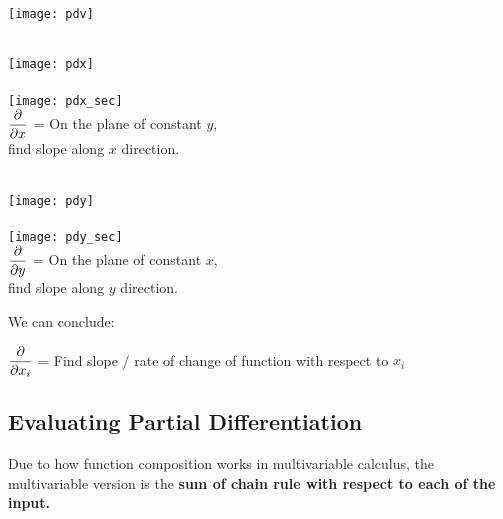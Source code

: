 \documentclass[class=article, crop=false, 12pt]{standalone}
\begin{document}
\begin{center}
    \texttt{[image: pdv]}
    \\[1em]
    \begin{minipage}{0.48\textwidth}
        \centering
        \\
        \texttt{[image: pdx]}
        \\
        \yellow{\Large $\Downarrow$}
        \\
        \texttt{[image: pdx\_sec]}
        \\
        $\pdvv{x}$ = On the plane of constant $y$, \\
        \hspace{6ex} find slope along $x$ direction.
    \end{minipage}
    \hfill\vline\hfill
    \begin{minipage}{0.48\textwidth}
        \centering
        \\
        \texttt{[image: pdy]}
        \\
        \blue{\Large $\Downarrow$}
        \\
        \texttt{[image: pdy\_sec]}
        \\
        $\pdvv{y}$ = On the plane of constant $x$, \\
        \hspace{6ex} find slope along $y$ direction.
    \end{minipage}
\end{center}


\newpage
We can conclude:
\begin{center}
    \begin{minipage}{0.75\textwidth}
        \begin{framed}
            \centering
            $\pdvv{x_i}$ = Find slope / rate of change of function with respect to $x_i$
        \end{framed}
    \end{minipage}
\end{center}

    


\subsection{Evaluating Partial Differentiation}

Due to how function composition works in multivariable calculus, 
the multivariable version is the \bf{sum of chain rule with respect to each of the input.}
\end{document}
